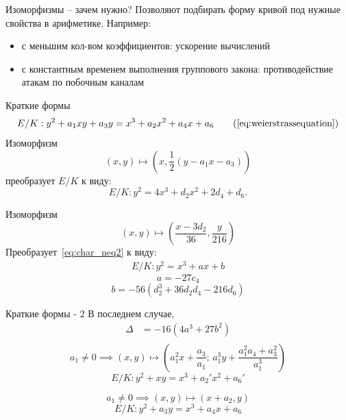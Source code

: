 \documentclass{beamer}
\begin{document}
\begin{frame}{Изоморфизмы -- зачем нужно?}
    Позволяют подбирать форму кривой под нужные свойства в арифметике. Например:
    \begin{itemize}
        \item с меньшим кол-вом коэффициентов: ускорение вычислений 
        \item с константным временем выполнения группового закона: противодействие атакам по побочным каналам
    \end{itemize}
\end{frame}

\begin{frame}{Краткие формы}
    \begin{equation*}
        E/K: y^2 + a_1 xy + a_3 y = x^3 + a_2 x^2 + a_4 x + a_6 \tag{\ref{eq:weierstrassequation}}
    \end{equation*}
    Изоморфизм \[(x, y)\mapsto \left(x, \frac{1}{2}(y-a_1x-a_3)\right)\] преобразует $E/K$ к виду:
    \begin{equation}
        \label{eq:char_neq2}
        E/K: y^2 = 4x^3 + d_2x^2 + 2d_4 + d_6.
    \end{equation}
    
    Изоморфизм
    \[
    (x, y) \mapsto \left(\frac{x-3d_2}{36}, \frac{y}{216}\right)
    \]
    Преобразует~\eqref{eq:char_neq2} к виду:
    \begin{align}
        E/K: y^2 = x^3 + ax + b
    \end{align}
    \[
    a = -27 c_4
    \]
    \[
    b = -56(d_2^3 + 36 d_2 d_4 - 216 d_6) 
    \]
\end{frame}

\begin{frame}{Краткие формы - $2$}
В последнем случае, 
\begin{align*}
    \Delta &= -16(4a^3 + 27b^2) \\ \nonumber
\end{align*}
\[
a_1 \neq 0 \implies (x, y) \mapsto \left(a_1^2x+\frac{a_3}{a_1}; \, a_1^3y + \frac{a_1^2a_4+a_3^2}{a_1^3}\right)
\]
\begin{equation}
    E/K: y^2+xy=x^3+a_2'x^2+a_6'
\end{equation}

\[
a_1 \neq 0 \implies (x, y) \mapsto (x+a_2, y)
\]
\begin{equation}
    E/K: y^2+a_3y = x^3+a_4x+a_6
\end{equation}
\end{frame}
\end{document}

